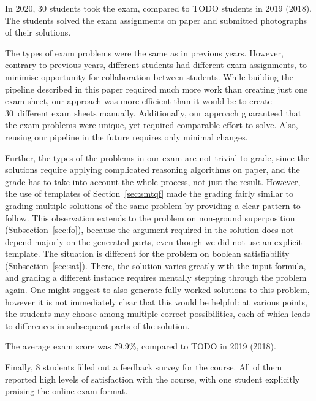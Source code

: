 In 2020, 30 students took the exam, compared to TODO students in 2019 (2018).
The students solved the exam assignments on paper and submitted photographs of their
solutions.

The types of exam problems were the same as in previous years.
However, contrary to previous years, different students had different exam
assignments, to minimise opportunity for collaboration between students.
%
While building the pipeline described in this paper required much more work
than creating just one exam sheet, our approach was more efficient than
it would be to create 30~different exam sheets manually. Additionally,
our approach guaranteed that the exam problems were
unique, yet required comparable effort to solve.
Also, reusing our pipeline in the future requires only minimal changes.

Further, the types of the problems in our exam are not trivial to grade, since
the solutions require applying complicated reasoning algorithms on paper, and
the grade has to take into account the whole process, not just the result.
However, the use of templates of Section~\ref{sec:smtqf}
made the grading fairly similar to grading multiple
solutions of the same problem by providing a clear pattern to follow.
%
This observation extends to %
the problem on non-ground superposition (Subsection~\ref{sec:fo}),
because the argument required in the solution does not depend majorly on the generated parts,
even though we did not use an explicit template.
%
The situation is different for %
the problem on boolean satisfiability (Subsection~\ref{sec:sat}).
There, the solution varies greatly with the input formula,
and grading a different instance requires mentally stepping through the problem again.
One might suggest to also generate fully worked solutions to this problem,
however it is not immediately clear that this would be helpful:
at various points, the students may choose among multiple correct possibilities,
each of which leads to differences in subsequent parts of the solution.

The average exam score was 79.9\%, compared to TODO in 2019 (2018).

Finally, 8 students filled out a feedback survey for the course. All of them reported
high levels of satisfaction with the course, with one student explicitly praising the
online exam format.
